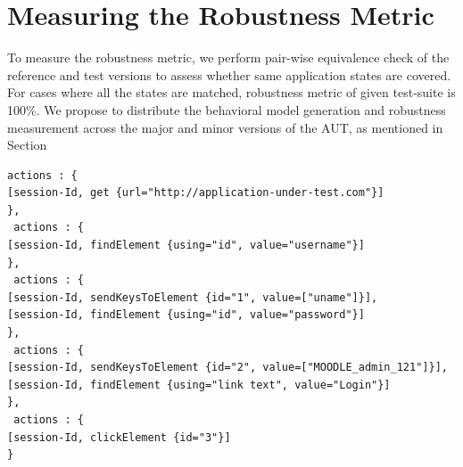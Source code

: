 \section{Measuring the Robustness Metric}
\label{sec:MeasureRobMetric}
\vspace{-2mm} To measure the robustness metric, we perform pair-wise equivalence check of the reference and test versions to assess whether same application states are covered. For cases where all the states are matched, robustness metric of given test-suite is 100\%. We propose to distribute the behavioral model generation and robustness measurement across the major and minor versions of the AUT, as mentioned in Section


\begin{center}
\begin{scriptsize}
\centering
\lstset{
  basicstyle=\ttfamily,
  columns=fullflexible,
  keepspaces=true,
}
  
\begin{lstlisting}[caption=Page-Objects design for \texttt{loginTest},label=code2]
actions : { 
[session-Id, get {url="http://application-under-test.com"}]
},
 actions : { 
[session-Id, findElement {using="id", value="username"}]
},
 actions : { 
[session-Id, sendKeysToElement {id="1", value=["uname"]}],
[session-Id, findElement {using="id", value="password"}]
},
 actions : { 
[session-Id, sendKeysToElement {id="2", value=["MOODLE_admin_121"]}],
[session-Id, findElement {using="link text", value="Login"}]
},
 actions : { 
[session-Id, clickElement {id="3"}]
}
\end{lstlisting}
\end{scriptsize} 
\end{center}



